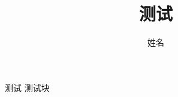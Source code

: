 \documentclass{ctexbeamer}
\begin{document}
    \title{测试}
    \author{姓名}
    \begin{frame}
        \begin{block}{测试}
            测试块
        \end{block}
    \end{frame}
\end{document}
